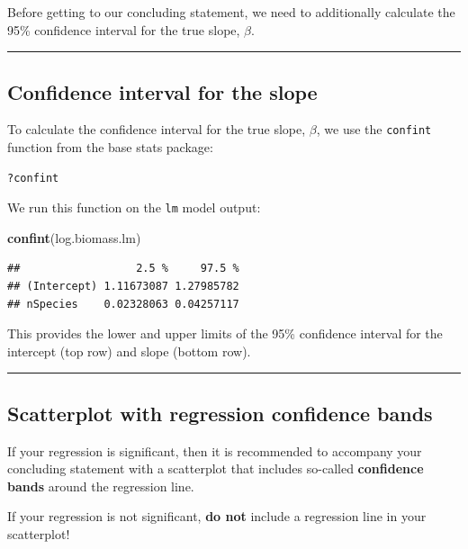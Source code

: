 \documentclass[
]{book}
\newenvironment{Shaded}{\begin{snugshade}}{\end{snugshade}}
\newcommand{\FunctionTok}[1]{\textcolor[rgb]{0.13,0.29,0.53}{\textbf{#1}}}
\newcommand{\NormalTok}[1]{#1}
\begin{document}
Before getting to our concluding statement, we need to additionally calculate the 95\% confidence interval for the true slope, \(\beta\).

\begin{center}\rule{0.5\linewidth}{0.5pt}\end{center}

\subsection{Confidence interval for the slope}\label{confidence-interval-for-the-slope}

To calculate the confidence interval for the true slope, \(\beta\), we use the \texttt{confint} function from the base stats package:

\begin{verbatim}
?confint
\end{verbatim}

We run this function on the \texttt{lm} model output:

\begin{Shaded}
\begin{Highlighting}[]
\FunctionTok{confint}\NormalTok{(log.biomass.lm)}
\end{Highlighting}
\end{Shaded}

\begin{verbatim}
##                  2.5 %     97.5 %
## (Intercept) 1.11673087 1.27985782
## nSpecies    0.02328063 0.04257117
\end{verbatim}

This provides the lower and upper limits of the 95\% confidence interval for the intercept (top row) and slope (bottom row).

\begin{center}\rule{0.5\linewidth}{0.5pt}\end{center}

\subsection{Scatterplot with regression confidence bands}\label{scatterplot-with-regression-confidence-bands}

If your regression is significant, then it is recommended to accompany your concluding statement with a scatterplot that includes so-called \textbf{confidence bands} around the regression line.

If your regression is not significant, \textbf{do not} include a regression line in your scatterplot!
\end{document}
